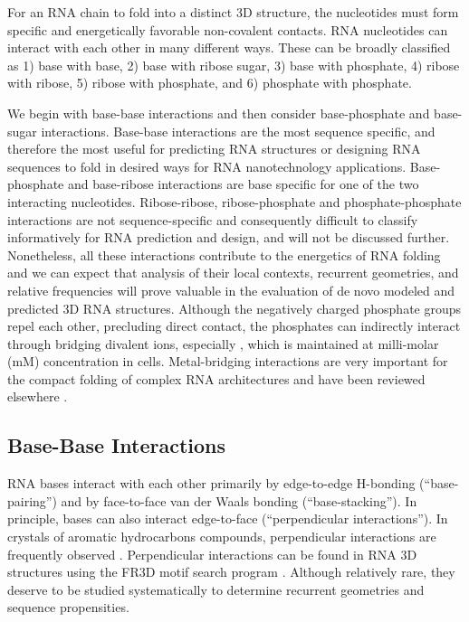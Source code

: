 For an RNA chain to fold into a distinct 3D structure, the nucleotides must form
specific and energetically favorable non-covalent contacts. RNA nucleotides can
interact with each other in many different ways. These can be broadly classified
as 1) base with base, 2) base with ribose sugar, 3) base with phosphate, 4)
ribose with ribose, 5) ribose with phosphate, and 6) phosphate with phosphate. 

We begin with base-base interactions and then consider base-phosphate and
base-sugar interactions. Base-base interactions are the most sequence specific,
and therefore the most useful for predicting RNA structures or designing RNA
sequences to fold in desired ways for RNA nanotechnology applications.
Base-phosphate and base-ribose interactions are base specific for one of the two
interacting nucleotides. Ribose-ribose, ribose-phosphate and phosphate-phosphate
interactions are not sequence-specific and consequently difficult to classify
informatively for RNA prediction and design, and will not be discussed further.
Nonetheless, all these interactions contribute to the energetics of RNA folding
and we can expect that analysis of their local contexts, recurrent geometries,
and relative frequencies will prove valuable in the evaluation of de novo
modeled and predicted 3D RNA structures. Although the negatively charged
phosphate groups repel each other, precluding direct contact, the phosphates can
indirectly interact through bridging divalent ions, especially , which is
maintained at milli-molar (mM) concentration in cells. Metal-bridging
interactions are very important for the compact folding of complex RNA
architectures and have been reviewed elsewhere \cite{Woodson2005, Bowman2012}. 

\subsection{Base-Base Interactions}

RNA bases interact with each other primarily by edge-to-edge H-bonding
(``base-pairing'') and by face-to-face van der Waals bonding
(``base-stacking''). In principle, bases can also interact edge-to-face
(``perpendicular interactions''). In crystals of aromatic hydrocarbons
compounds, perpendicular interactions are frequently observed
\cite{Desiraju1989}. Perpendicular interactions can be found in RNA 3D
structures using the FR3D motif search program \cite{Petrov2011a}. Although
relatively rare, they deserve to be studied systematically to determine
recurrent geometries and sequence propensities. 

